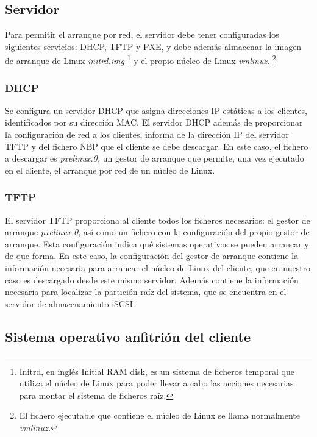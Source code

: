 \documentclass[spanisheDIVcalc,twoside,parskip-,pointlessnumbers,final]{scrbook}
\begin{document}
\subsection{Servidor}

Para permitir el arranque por red, el servidor debe tener configuradas
los siguientes servicios: DHCP, TFTP y PXE, y debe además almacenar
la imagen de arranque de Linux \emph{initrd.img}%
\footnote{Initrd, en inglés Initial RAM disk, es un sistema de ficheros temporal
que utiliza el núcleo de Linux para poder llevar a cabo las acciones
necesarias para montar el sistema de ficheros raíz.%
} y el propio núcleo de Linux \emph{vmlinuz}.%
\footnote{El fichero ejecutable que contiene el núcleo de Linux se llama normalmente
\emph{vmlinuz.}%
}


\subsubsection{DHCP}

Se configura un servidor DHCP que asigna direcciones IP estáticas
a los clientes, identificados por su dirección MAC. El servidor DHCP
además de proporcionar la configuración de red a los clientes, informa
de la dirección IP del servidor TFTP y del fichero NBP que el cliente
se debe descargar. En este caso, el fichero a descargar es \emph{pxelinux.0,}
un gestor de arranque que permite, una vez ejecutado en el cliente,
el arranque por red de un núcleo de Linux.


\subsubsection{TFTP}

El servidor TFTP proporciona al cliente todos los ficheros necesarios:
el gestor de arranque \emph{pxelinux.0}, así como un fichero con la
configuración del propio gestor de arranque. Esta configuración indica
qué sistemas operativos se pueden arrancar y de que forma. En este
caso, la configuración del gestor de arranque contiene la información
necesaria para arrancar el núcleo de Linux del cliente, que en nuestro
caso es descargado desde este mismo servidor. Además contiene la información
necesaria para localizar la partición raíz del sistema, que se encuentra
en el servidor de almacenamiento iSCSI.


\subsection{Sistema operativo anfitrión del cliente}
\end{document}
